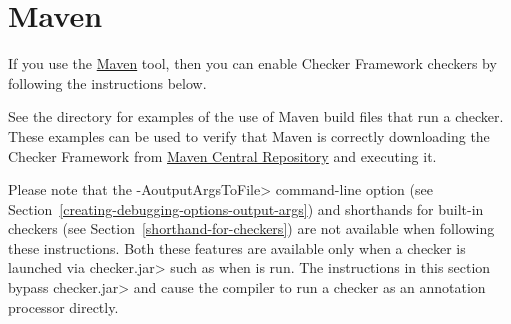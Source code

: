 \section{Maven\label{maven}}

If you use the \href{http://maven.apache.org/}{Maven} tool,
then you can enable Checker Framework checkers by following the
instructions below.

See the directory  for examples of the use of
Maven build files that run a checker.  These examples can be used to verify that
Maven is correctly downloading the Checker Framework from
\href{https://search.maven.org/search?q=org.checkerframework}{Maven
  Central Repository} and executing it.

Please note that the \<-AoutputArgsToFile> command-line option
(see Section~\ref{creating-debugging-options-output-args}) and shorthands for built-in checkers
(see Section~\ref{shorthand-for-checkers}) are not available when
following these instructions.  Both these features are available only when a checker is
launched via \<checker.jar> such as when 
is run.  The instructions in this section
bypass \<checker.jar> and cause the compiler to run a
checker as an annotation processor directly.

